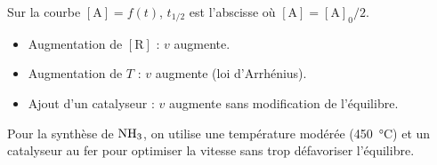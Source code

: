 \begin{exemple}
Sur la courbe $[\mathrm{A}] = f(t)$, $t_{1/2}$ est l'abscisse où $[\mathrm{A}] = [\mathrm{A}]_0/2$.
\end{exemple}

\begin{itemize}
\item Augmentation de $[\mathrm{R}]$ : $v$ augmente.
\item Augmentation de $T$ : $v$ augmente (loi d'Arrhénius).
\item Ajout d'un catalyseur : $v$ augmente sans modification de l'équilibre.
\end{itemize}

\begin{exemple}
Pour la synthèse de $\ce{NH3}$, on utilise une température modérée (\SI{450}{\celsius}) et un catalyseur au fer pour optimiser la vitesse sans trop défavoriser l'équilibre.
\end{exemple}